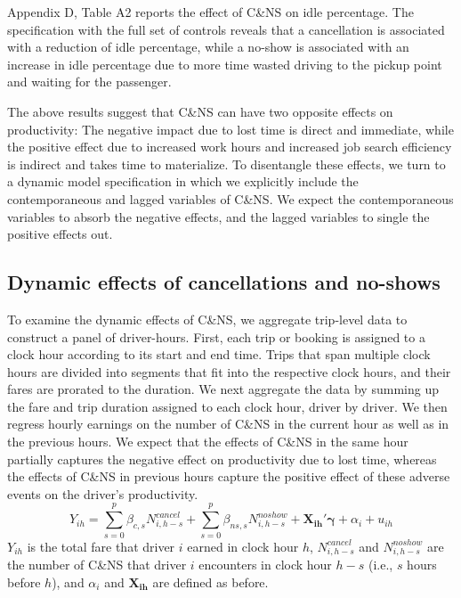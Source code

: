 \documentclass[reviewmode,AEJ]{AEA}
\begin{document}
Appendix D, Table A2 reports the effect of C\&NS on idle percentage. The specification with the full 
set of controls reveals that a cancellation is associated with a reduction of idle percentage, while 
a no-show is associated with an increase in idle percentage due to more time wasted driving to the pickup
point and waiting for the passenger.

The above results suggest that C\&NS can have two opposite effects on productivity: The negative impact 
due to lost time is direct and immediate, while the positive effect due to increased work hours and increased 
job search efficiency is indirect and takes time to materialize. To disentangle these effects, we turn to a
dynamic model specification in which we explicitly include the contemporaneous and lagged variables of C\&NS. 
We expect the contemporaneous variables to absorb the negative effects, and the lagged variables to single the 
positive effects out.


\subsection{Dynamic effects of cancellations and no-shows}
To examine the dynamic effects of C\&NS, we aggregate trip-level data to construct a panel of driver-hours. 
First, each trip or booking is assigned to a clock hour according to its start and end time.
Trips that span multiple clock hours are divided into segments that fit into the respective clock hours,
and their fares are prorated to the duration. We next aggregate the data by summing up the fare and trip 
duration assigned to each clock hour, driver by driver. We then regress hourly earnings 
on the number of C\&NS in the current hour as well as in the previous hours. We expect that the effects of
C\&NS in the same hour partially captures the negative effect on productivity due to lost time, 
whereas the effects of C\&NS in previous hours capture the positive effect of these adverse events on 
the driver's productivity.
\begin{equation}
Y_{ih} = \sum_{s=0}^p \beta_{c,s} N^{cancel}_{i,h-s} + \sum_{s=0}^p \beta_{ns,s} N^{noshow}_{i,h-s} +  \mathbf{X_{ih}}'\mathbf{\gamma} + \alpha_i + u_{ih}
\end{equation}
$Y_{ih}$ is the total fare that driver $i$ earned in clock hour $h$, $N^{cancel}_{i, h-s}$ and $N^{noshow}_{i, h-s}$ are the number of C\&NS that driver $i$ encounters in clock hour $h-s$ (i.e., $s$ hours before $h$), and $\alpha_i$ and $\mathbf{X_{ih}}$ are defined as before.
\end{document}
